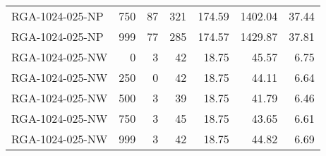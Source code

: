 \begin{table}[htbp]
{\begin{tabular}{lrrrrrr}
    RGA-1024-025-NP & 750    & 87     & 321    & 174.59 & 1402.04 & 37.44 \\
    RGA-1024-025-NP & 999    & 77     & 285    & 174.57 & 1429.87 & 37.81 \\ \hline
    RGA-1024-025-NW & 0      & 3      & 42     & 18.75  & 45.57  & 6.75 \\
    RGA-1024-025-NW & 250    & 0      & 42     & 18.75  & 44.11  & 6.64 \\
    RGA-1024-025-NW & 500    & 3      & 39     & 18.75  & 41.79  & 6.46 \\
    RGA-1024-025-NW & 750    & 3      & 45     & 18.75  & 43.65  & 6.61 \\
    RGA-1024-025-NW & 999    & 3      & 42     & 18.75  & 44.82  & 6.69 \\
    \bottomrule
    \end{tabular}}
  \label{tab:addlabel}%
\end{table}%
